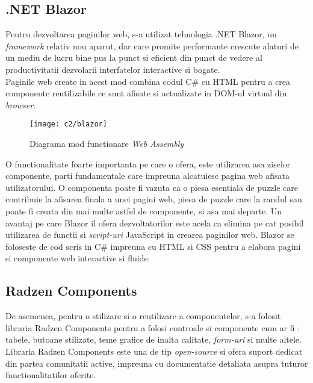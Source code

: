 \subsection*{.NET Blazor}
Pentru dezvoltarea paginilor web, s-a utilizat tehnologia .NET Blazor, un \textit{framework} relativ nou aparut, dar care promite performante crescute alaturi de un mediu de lucru bine pus la punct si eficient din punct de vedere al productivitatii dezvolarii interfatelor interactive si bogate.\\
Paginile web create in acest mod combina codul C\# cu HTML pentru a crea componente reutilizabile ce sunt  afisate si actualizate in DOM-ul virtual din \textit{browser}.\\

\vspace{1cm}
\begin{figure}[h]
	\centering
	
	\texttt{[image: c2/blazor]}
	\caption{Diagrama mod functionare \textit{Web Assembly}}
\end{figure}

O functionalitate foarte importanta pe care o ofera, este utilizarea asa ziselor componente, parti fundamentale care impreuna alcatuiesc pagina web afisata utilizatorului. O componenta poate fi vazuta ca o piesa esentiala de puzzle care contribuie la afisarea finala a unei pagini web, piesa de puzzle care la randul sau poate fi creata din mai multe astfel de componente, si asa mai departe.
Un avantaj pe care Blazor il ofera dezvoltatorilor este acela ca elimina pe cat posibil utilizarea de functii si \textit{script-uri }JavaScript in crearea paginilor web. Blazor se foloseste de cod scris in C\# impreuna cu HTML si CSS pentru a elabora pagini si componente web interactive si fluide.\\

\subsection*{Radzen Components}
De asemenea, pentru o stilizare si o reutilizare a componentelor, s-a folosit libraria Radzen Components pentru a folosi controale si componente cum ar fi : tabele, butoane stilizate, teme grafice de inalta calitate, \textit{form-uri} si multe altele.\\
 Libraria Radzen Components este una de tip \textit{open-source} si ofera suport dedicat din partea comunitatii active, impreuna cu documentatie detaliata asupra tuturor functionalitatilor oferite.



